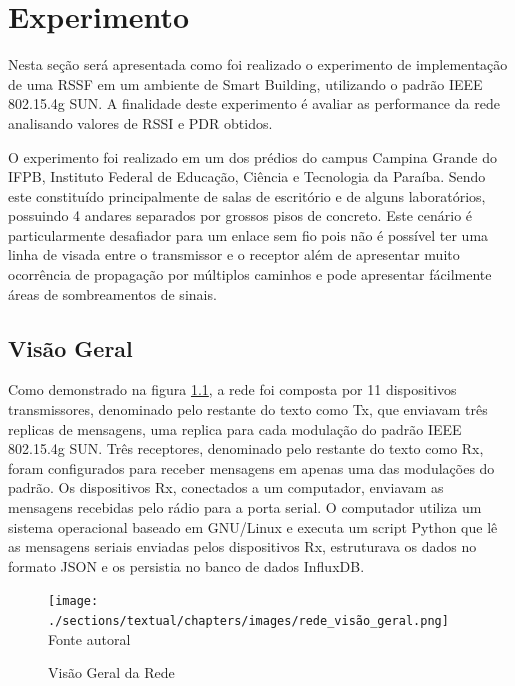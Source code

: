 \chapter{Experimento}
\label{experimento}

Nesta seção será apresentada como foi realizado o experimento de implementação de uma RSSF em um ambiente de Smart Building, utilizando o padrão IEEE 802.15.4g SUN. A finalidade deste experimento é avaliar as performance da rede analisando valores de RSSI e PDR obtidos.

O experimento foi realizado em um dos prédios do campus Campina Grande do IFPB, Instituto Federal de Educação, Ciência e Tecnologia da Paraíba. Sendo este constituído principalmente de salas de escritório e de alguns laboratórios, possuindo 4 andares separados por grossos pisos de concreto. Este cenário é particularmente desafiador para um enlace sem fio pois não é possível ter uma linha de visada entre o transmissor e o receptor além de apresentar muito ocorrência de propagação por múltiplos caminhos e pode apresentar fácilmente áreas de sombreamentos de sinais.

\section{Visão Geral}
\label{subsec:visaogeral}
Como demonstrado na figura \ref{fig:rede_visão_geral}, a rede foi composta por 11 dispositivos transmissores, denominado pelo restante do texto como Tx, que enviavam três replicas de mensagens, uma replica para cada modulação do padrão IEEE 802.15.4g SUN. Três receptores, denominado pelo restante do texto como Rx, foram configurados para receber mensagens em apenas uma das modulações do padrão. Os dispositivos Rx, conectados a um computador, enviavam as mensagens recebidas pelo rádio para a porta serial. O computador utiliza um sistema operacional baseado em GNU/Linux e executa um script Python que lê as mensagens seriais enviadas pelos dispositivos Rx, estruturava os dados no formato JSON e os persistia no banco de dados InfluxDB.

\begin{figure}[h]
    \begin{center}
        \caption{Visão Geral da Rede}
        \texttt{[image: ./sections/textual/chapters/images/rede\_visão\_geral.png]}\\
        Fonte autoral
        \label{fig:rede_visão_geral}
    \end{center}
\end{figure}


